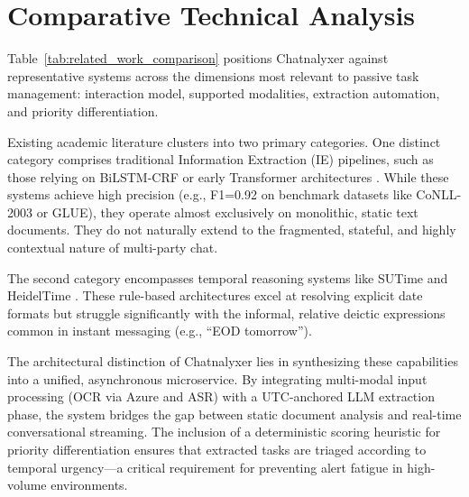\section{Comparative Technical Analysis}
\label{sec:comparative_analysis}

Table~\ref{tab:related_work_comparison} positions Chatnalyxer against representative systems across the dimensions most relevant to passive task management: interaction model, supported modalities, extraction automation, and priority differentiation.

Existing academic literature clusters into two primary categories. One distinct category comprises traditional Information Extraction (IE) pipelines, such as those relying on BiLSTM-CRF \cite{lample2016} or early Transformer architectures \cite{bert2019}. While these systems achieve high precision (e.g., F1=0.92 on benchmark datasets like CoNLL-2003 or GLUE), they operate almost exclusively on monolithic, static text documents. They do not naturally extend to the fragmented, stateful, and highly contextual nature of multi-party chat.

The second category encompasses temporal reasoning systems like SUTime \cite{chang2012sutime} and HeidelTime \cite{strotgen2010heideltime}. These rule-based architectures excel at resolving explicit date formats but struggle significantly with the informal, relative deictic expressions common in instant messaging (e.g., ``EOD tomorrow''). 

The architectural distinction of Chatnalyxer lies in synthesizing these capabilities into a unified, asynchronous microservice. By integrating multi-modal input processing (OCR via Azure and ASR) with a UTC-anchored LLM extraction phase, the system bridges the gap between static document analysis and real-time conversational streaming. The inclusion of a deterministic scoring heuristic for priority differentiation ensures that extracted tasks are triaged according to temporal urgency—a critical requirement for preventing alert fatigue in high-volume environments.
